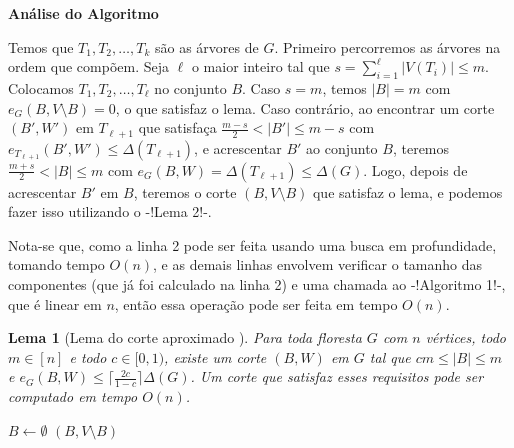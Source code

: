 \documentclass[a4paper,12pt]{article}
\newtheorem{lem}{Lema}
\begin{document}
\bigskip
\bigskip

\textbf{Análise do Algoritmo}

	Temos que $T_1, T_2, \ldots,T_k $ são 
	as árvores de $G$. 
	Primeiro percorremos as árvores na ordem que compõem. 
	Seja $\ell$ o maior inteiro tal que 
	$s = \displaystyle\sum_{i=1}^{\ell}|V(T_i)| \le m$.
	Colocamos $T_1,T_2, \ldots,T_\ell$ no conjunto $B$.
	Caso $s=m$, temos $|B|=m$ com  $e_G(B,V\setminus B)=0$, o que satisfaz o lema.
	Caso contrário, ao encontrar um corte $(B',W')$ em $T_{\ell+1}$ que
	satisfaça $\frac{m-s}{2}<|B'|\le m-s$ com $e_{T_{\ell+1}}(B',W') \le 
	\Delta(T_{\ell+1})$, e acrescentar $B'$ ao conjunto
	$B$, teremos
	$\frac{m+s}{2}<|B| \le m$ com 
	$e_G(B,W) = \Delta(T_{\ell+1}) \le \Delta(G)$.
	Logo, depois de acrescentar $B'$ em $B$, teremos o corte $(B,V\setminus B)$
	que satisfaz o lema, e podemos fazer isso utilizando o -!Lema 2!-.
	
	Nota-se que, como a linha 2 pode ser feita usando uma
	busca em profundidade, tomando tempo $O(n)$, e as demais 
	linhas envolvem verificar o tamanho das componentes 
	(que já foi calculado na linha 2) e uma chamada ao
	-!Algoritmo 1!-, que é linear em $n$, então essa operação pode 
	ser feita em tempo $O(n)$. 

\bigskip
\bigskip
\bigskip
\bigskip
\bigskip
\bigskip
\bigskip
\bigskip


\begin{lem}[Lema do corte aproximado {\cite[Lemma 3]{Schmidt15}}]

	Para toda floresta $G$ com $n$ vértices, todo $m \in [n]$
	e todo $c \in [0,1)$,
	existe um corte $(B,W)$ em $G$ tal que 
	$cm \le |B| \le m$ e
	$e_G(B,W) \le \lceil \frac{2c}{1-c}\rceil \Delta(G)$.
	Um corte que satisfaz esses requisitos pode ser computado em
	tempo $O(n)$.
\end{lem}

\medskip
\medskip

\begin{algorithm}[H]

	\caption{Computa corte aproximado em uma floresta}
	$B \gets \emptyset$\;
	{
	}
	\Return $(B,V\setminus B)$

\end{algorithm}	
\end{document}
